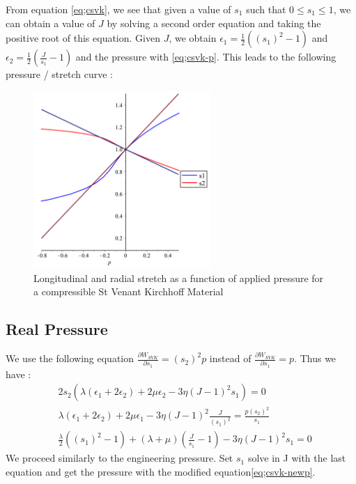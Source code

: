\documentclass[a4paper,11pt]{article}
\begin{document}
From equation \ref{eq;csvk}, we see that given a value of $s_1$ such that $0\leq s_1 \leq 1$, we can obtain a value of $J$ by solving a second order equation and taking the positive root of this equation.  Given $J$, we obtain $\epsilon_1=\frac{1}{2}((s_1)^2 -1)$ and $\epsilon_2=\frac{1}{2}(\frac{J}{s_1}-1)$ and the pressure with \ref{eq;csvk-p}. This leads to the following pressure / stretch curve :
\begin{figure}[!htbp]
	\centering
    \includegraphics[width=0.60\textwidth]{CurveCSVK}
	\caption{Longitudinal and radial stretch as a function of applied pressure for a compressible St Venant Kirchhoff Material}
	\label{fig:PureTractionCSVK}
\end{figure}
 
\subsection{Real Pressure}

We use the following equation   $\frac{\partial W_{SVK}}{\partial s_1}=(s_2)^2 p$ instead of  $\frac{\partial W_{SVK}}{\partial s_1}=p$.
Thus we have :
\begin{align}
&2 s_2 \left (\lambda (\epsilon_1 + 2 \epsilon_2) + 2\mu \epsilon_2 - 3\eta (J-1)^2 s_1 \right )=0 \nonumber \\
& \lambda (\epsilon_1 + 2 \epsilon_2) + 2\mu \epsilon_1 - 3\eta (J-1)^2 \frac{J}{(s_1)^2} = \frac{p(s_2)^2}{s_1} \label{eq;csvk-newp} \\
& \frac{\lambda}{2} ((s_1)^2-1)  + (\lambda+\mu) (\frac{J}{s_1} -1) - 3\eta (J-1)^2 s_1 =0 
\end{align}
We proceed similarly to the engineering pressure. Set $s_1$ solve in J with the last equation and get the pressure with the modified equation\ref{eq;csvk-newp}.
\end{document}
